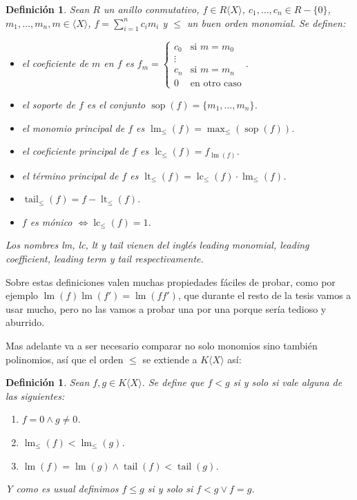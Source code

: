 \documentclass[12pt]{report}
\theoremstyle{customstyle}
\newtheorem{definition}[theorem]{Definición}
\theoremstyle{factstyle}
\DeclareMathOperator{\sop}{sop}
\DeclareMathOperator{\lm}{lm}
\DeclareMathOperator{\lc}{lc}
\DeclareMathOperator{\lt}{lt}
\DeclareMathOperator{\tail}{tail}
\begin{document}
\begin{definition}\label{def:cosas de polinomios}
  Sean $R$ un anillo conmutativo, $f ∈ R⟨X⟩$, $c_1, …, c_n ∈ R - \{0\}$, $m_1, …, m_n, m ∈ ⟨X⟩$, $f = ∑_{i = 1}^n c_i m_i$ y $≤$ un buen orden monomial. Se definen:
  \begin{itemize}
    \item el coeficiente de $m$ en $f$ es $f_m = \begin{cases} c_0&\text{si }m = m_0 \\ ⋮ & \\ c_n&\text{si }m = m_n \\ 0&\text{en otro caso} \end{cases} $.
    \item el soporte de $f$ es el conjunto $\sop(f) = \{m_1, …, m_n\}$.
    \item el monomio principal de $f$ es $\lm_≤(f) = \max_≤(\sop(f))$.
    \item el coeficiente principal de $f$ es $\lc_≤(f) = f_{\lm(f)}$.
    \item el término principal de $f$ es $\lt_≤(f) = \lc_≤(f) · \lm_≤(f)$.
    \item $\tail_≤(f) = f - \lt_≤(f)$.
    \item $f$ es mónico $⇔ \lc_≤(f) = 1$.
  \end{itemize}

  Los nombres lm, lc, lt y tail vienen del inglés leading monomial, leading coefficient, leading term y tail respectivamente.
\end{definition}

Sobre estas definiciones valen muchas propiedades fáciles de probar, como por ejemplo $\lm(f) \lm(f') = \lm(f f')$, que durante el resto de la tesis vamos a usar mucho, pero no las vamos a probar una por una porque sería tedioso y aburrido.

Mas adelante va a ser necesario comparar no solo monomios sino también polinomios, así que el orden $≤$ se extiende a $K⟨X⟩$ así:

\begin{definition}
  Sean $f, g ∈ K⟨X⟩$. Se define que $f < g$ si y solo si vale alguna de las siguientes:
  \begin{enumerate}
    \item $f = 0 ∧ g ≠ 0$.
    \item $\lm_≤(f) < \lm_≤(g)$.
    \item $\lm(f) = \lm(g) ∧ \tail(f) < \tail(g)$.
  \end{enumerate}
  Y como es usual definimos $f ≤ g$ si y solo si $f < g ∨ f = g$.
\end{definition}
\end{document}
